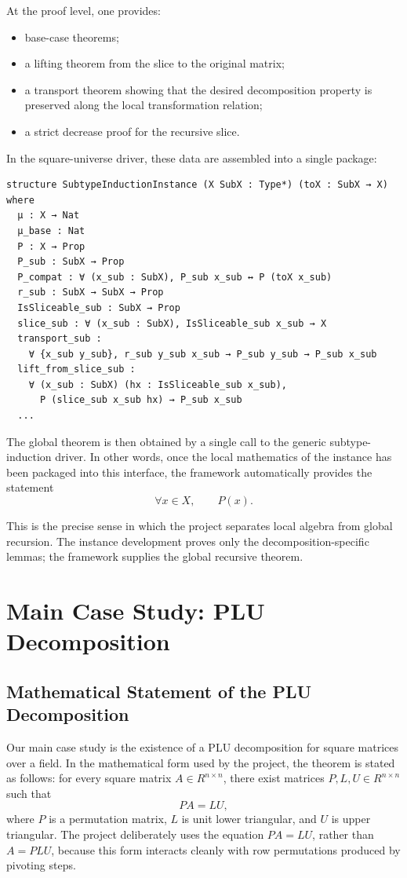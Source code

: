 \documentclass[pdflatex,sn-mathphys-num]{sn-jnl}%
\theoremstyle{thmstyleone}%
\theoremstyle{thmstyletwo}%
\theoremstyle{thmstylethree}%
\begin{document}
At the proof level, one provides:

\begin{itemize}
\item base-case theorems;
\item a lifting theorem from the slice to the original matrix;
\item a transport theorem showing that the desired decomposition property is preserved along the local transformation relation;
\item a strict decrease proof for the recursive slice.
\end{itemize}

In the square-universe driver, these data are assembled into a single package:

\begin{lstlisting}
structure SubtypeInductionInstance (X SubX : Type*) (toX : SubX → X) where
  μ : X → Nat
  μ_base : Nat
  P : X → Prop
  P_sub : SubX → Prop
  P_compat : ∀ (x_sub : SubX), P_sub x_sub ↔ P (toX x_sub)
  r_sub : SubX → SubX → Prop
  IsSliceable_sub : SubX → Prop
  slice_sub : ∀ (x_sub : SubX), IsSliceable_sub x_sub → X
  transport_sub :
    ∀ {x_sub y_sub}, r_sub y_sub x_sub → P_sub y_sub → P_sub x_sub
  lift_from_slice_sub :
    ∀ (x_sub : SubX) (hx : IsSliceable_sub x_sub),
      P (slice_sub x_sub hx) → P_sub x_sub
  ...
\end{lstlisting}

The global theorem is then obtained by a single call to the generic subtype-induction driver.  In other words, once the local mathematics of the instance has been packaged into this interface, the framework automatically provides the statement
\[
\forall x \in X,\qquad P(x).
\]

This is the precise sense in which the project separates local algebra from global recursion.  The instance development proves only the decomposition-specific lemmas; the framework supplies the global recursive theorem.


\section{Main Case Study: PLU Decomposition}
\label{sec:plu}

\subsection{Mathematical Statement of the PLU Decomposition}
Our main case study is the existence of a PLU decomposition for square matrices over a field.  In the mathematical form used by the project, the theorem is stated as follows: for every square matrix \(A \in R^{n \times n}\), there exist matrices \(P,L,U \in R^{n \times n}\) such that
\[
P A = L U,
\]
where \(P\) is a permutation matrix, \(L\) is unit lower triangular, and \(U\) is upper triangular.  The project deliberately uses the equation \(P A = L U\), rather than \(A = P L U\), because this form interacts cleanly with row permutations produced by pivoting steps.
\end{document}
